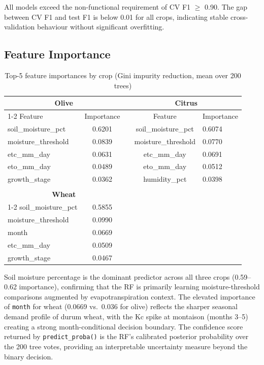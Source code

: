 \documentclass[12pt,a4paper]{report}
\begin{document}
All models exceed the non-functional requirement of CV F1 $\geq$ 0.90. The gap between CV F1 and test F1 is below 0.01 for all crops, indicating stable cross-validation behaviour without significant overfitting.

\subsection{Feature Importance}

\begin{table}[H]
\centering
\caption{Top-5 feature importances by crop (Gini impurity reduction, mean over 200 trees)}
\label{tab:fimp}
\begin{tabular}{lclcl}
\toprule
\multicolumn{2}{c}{\textbf{Olive}} & & \multicolumn{2}{c}{\textbf{Citrus}} \\
\cmidrule{1-2}\cmidrule{4-5}
Feature & Importance & & Feature & Importance \\
soil\_moisture\_pct   & 0.6201 & & soil\_moisture\_pct   & 0.6074 \\
moisture\_threshold   & 0.0839 & & moisture\_threshold   & 0.0770 \\
etc\_mm\_day          & 0.0631 & & etc\_mm\_day          & 0.0691 \\
eto\_mm\_day          & 0.0489 & & eto\_mm\_day          & 0.0512 \\
growth\_stage         & 0.0362 & & humidity\_pct         & 0.0398 \\
\midrule
\multicolumn{5}{c}{} \\
\multicolumn{2}{c}{\textbf{Wheat}} & & & \\
\cmidrule{1-2}
soil\_moisture\_pct   & 0.5855 & & & \\
moisture\_threshold   & 0.0990 & & & \\
month                 & 0.0669 & & & \\
etc\_mm\_day          & 0.0509 & & & \\
growth\_stage         & 0.0467 & & & \\
\bottomrule
\end{tabular}
\end{table}

Soil moisture percentage is the dominant predictor across all three crops (0.59--0.62 importance), confirming that the RF is primarily learning moisture-threshold comparisons augmented by evapotranspiration context. The elevated importance of \texttt{month} for wheat (0.0669 vs.\ 0.036 for olive) reflects the sharper seasonal demand profile of durum wheat, with the Kc spike at montaison (months 3--5) creating a strong month-conditional decision boundary. The confidence score returned by \texttt{predict\_proba()} is the RF's calibrated posterior probability over the 200 tree votes, providing an interpretable uncertainty measure beyond the binary decision.
\end{document}
